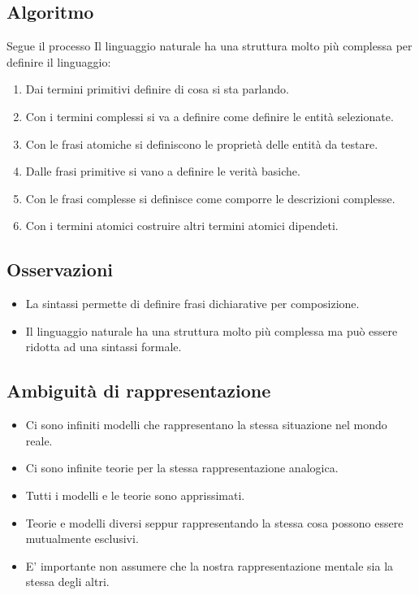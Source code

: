 \documentclass[../main.tex]{subfiles}
\begin{document}
    \subsection{Algoritmo}
    Segue il processo Il linguaggio naturale ha una struttura molto più complessa per definire il linguaggio:
    \begin{enumerate}
        \item Dai termini primitivi definire di cosa si sta parlando.
        \item Con i termini complessi si va a definire come definire le entità selezionate.
        \item Con le frasi atomiche si definiscono le proprietà delle entità da testare.
        \item Dalle frasi primitive si vano a definire le verità basiche.
        \item Con le frasi complesse si definisce come comporre le descrizioni complesse.
        \item Con i termini atomici costruire altri termini atomici dipendeti.
    \end{enumerate}

    \subsection{Osservazioni}
    \begin{itemize}
        \item La sintassi permette di definire frasi dichiarative per composizione.
        \item Il linguaggio naturale ha una struttura molto più complessa ma può essere ridotta ad una sintassi formale.
    \end{itemize}

    \subsection{Ambiguità di rappresentazione}
    \begin{itemize}
        \item Ci sono infiniti modelli che rappresentano la stessa situazione nel mondo reale.
        \item Ci sono infinite teorie per la stessa rappresentazione analogica.
        \item Tutti i modelli e le teorie sono apprissimati.
        \item Teorie e modelli diversi seppur rappresentando la stessa cosa possono essere mutualmente esclusivi.
        \item E' importante non assumere che la nostra rappresentazione mentale sia la stessa degli altri.
    \end{itemize}
\end{document}
